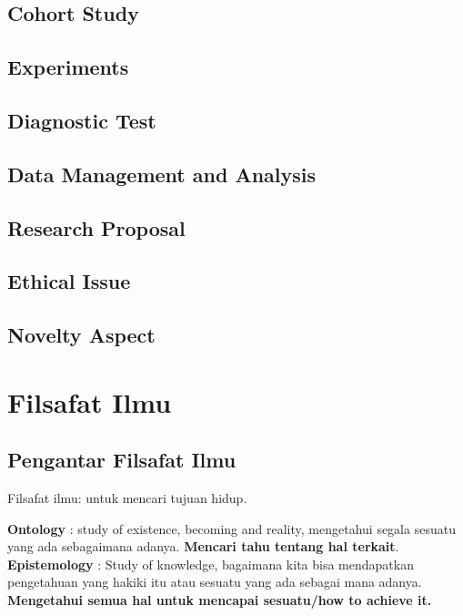 \documentclass[
  letterpaper,
  DIV=11,
  numbers=noendperiod]{scrreprt}
\begin{document}
\section{Cohort Study}\label{cohort-study}

\section{Experiments}\label{experiments}

\section{Diagnostic Test}\label{diagnostic-test}

\section{Data Management and
Analysis}\label{data-management-and-analysis}

\section{Research Proposal}\label{research-proposal}

\section{Ethical Issue}\label{ethical-issue}

\section{Novelty Aspect}\label{novelty-aspect}

\chapter{Filsafat Ilmu}\label{filsafat-ilmu}

\section{Pengantar Filsafat Ilmu}\label{pengantar-filsafat-ilmu}

Filsafat ilmu: untuk mencari tujuan hidup.

\textbf{Ontology} : study of existence, becoming and reality, mengetahui
segala sesuatu yang ada sebagaimana adanya. \textbf{Mencari tahu tentang
hal terkait}. \textbf{Epistemology} : Study of knowledge, bagaimana kita
bisa mendapatkan pengetahuan yang hakiki itu atau sesuatu yang ada
sebagai mana adanya. \textbf{Mengetahui semua hal untuk mencapai
sesuatu/how to achieve it.}
\end{document}
